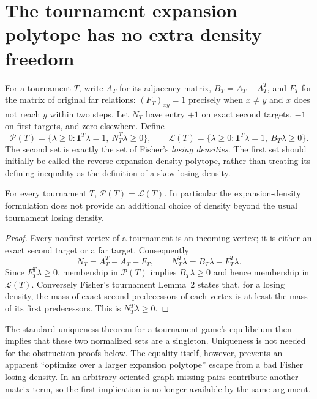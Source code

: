 \section{The tournament expansion polytope has no extra density freedom}
\label{sec:weighted-transport-density-collapse}

For a tournament $T$, write $A_T$ for its adjacency matrix,
$B_T=A_T-A_T^T$, and $F_T$ for the matrix of original far relations:
$(F_T)_{xy}=1$ precisely when $x\ne y$ and $x$ does not reach $y$
within two steps. Let $N_T$ have entry $+1$ on exact second targets,
$-1$ on first targets, and zero elsewhere. Define
\[
 \mathcal P(T)=\{\lambda\ge0:\mathbf1^T\lambda=1,
                         \ N_T^T\lambda\ge0\},\qquad
 \mathcal L(T)=\{\lambda\ge0:\mathbf1^T\lambda=1,
                         \ B_T\lambda\ge0\}.
\]
The second set is exactly the set of Fisher's \emph{losing densities}.
The first set should initially be called the reverse expansion-density
polytope, rather than treating its defining inequality as the definition
of a skew losing density.

\begin{lemma}
\label{lem:transport-density-collapse}
For every tournament $T$, $\mathcal P(T)=\mathcal L(T)$.
In particular the expansion-density formulation does not provide an
additional choice of density beyond the usual tournament losing density.
\end{lemma}
\begin{proof}
Every nonfirst vertex of a tournament is an incoming vertex; it is
either an exact second target or a far target. Consequently
\[
 N_T=A_T^T-A_T-F_T,\qquad
 N_T^T\lambda=B_T\lambda-F_T^T\lambda.
\]
Since $F_T^T\lambda\ge0$, membership in $\mathcal P(T)$ implies
$B_T\lambda\ge0$ and hence membership in $\mathcal L(T)$.
Conversely Fisher's tournament Lemma~2 states that, for a losing density,
the mass of exact second predecessors of each vertex is at least the
mass of its first predecessors. This is $N_T^T\lambda\ge0$.
\end{proof}

The standard uniqueness theorem for a tournament game's equilibrium
then implies that these two normalized sets are a singleton. Uniqueness
is not needed for the obstruction proofs below. The equality itself,
however, prevents an apparent ``optimize over a larger expansion
polytope'' escape from a bad Fisher losing density. In an arbitrary
oriented graph missing pairs contribute another matrix term, so the
first implication is no longer available by the same argument.

